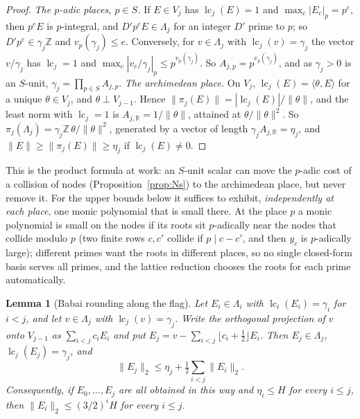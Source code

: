 \documentclass[11pt]{amsart}
\newtheorem{lemma}[theorem]{Lemma}
\theoremstyle{definition}
\theoremstyle{plain}
\newcommand{\Z}{\mathbb{Z}}
\providecommand{\R}{\mathbb{R}}
\begin{document}
\begin{proof}
\emph{The $p$-adic places, $p\in S$.} If $E\in V_j$ has $\operatorname{lc}_j(E)=1$ and $\max_c|E_c|_p=p^e$, then $p^eE$ is $p$-integral, and $D'p^eE\in\Lambda_j$ for an integer $D'$ prime to $p$; so $D'p^e\in\gamma_j\Z$ and $v_p(\gamma_j)\le e$. Conversely, for $v\in\Lambda_j$ with $\operatorname{lc}_j(v)=\gamma_j$ the vector $v/\gamma_j$ has $\operatorname{lc}_j=1$ and $\max_c|v_c/\gamma_j|_p\le p^{v_p(\gamma_j)}$. So $A_{j,p}=p^{v_p(\gamma_j)}$, and as $\gamma_j>0$ is an $S$-unit, $\gamma_j=\prod_{p\in S}A_{j,p}$. \emph{The archimedean place.} On $V_j$, $\operatorname{lc}_j(E)=\langle\theta,E\rangle$ for a unique $\theta\in V_j$, and $\theta\perp V_{j-1}$. Hence $\|\pi_j(E)\|=|\operatorname{lc}_j(E)|/\|\theta\|$, and the least norm with $\operatorname{lc}_j=1$ is $A_{j,\R}=1/\|\theta\|$, attained at $\theta/\|\theta\|^2$. So $\pi_j(\Lambda_j)=\gamma_j\Z\,\theta/\|\theta\|^2$, generated by a vector of length $\gamma_jA_{j,\R}=\eta_j$, and $\|E\|\ge\|\pi_j(E)\|\ge \eta_j$ if $\operatorname{lc}_j(E)\ne0$.
\end{proof}

This is the product formula at work: an $S$-unit scalar can move the $p$-adic cost of a collision of nodes (Proposition~\ref{prop:Ns}) to the archimedean place, but never remove it. For the upper bounds below it suffices to exhibit, \emph{independently at each place}, one monic polynomial that is small there. At the place $p$ a monic polynomial is small on the nodes if its roots sit $p$-adically near the nodes that collide modulo $p$ (two finite rows $c,c'$ collide if $p\mid c-c'$, and then $y_c$ is $p$-adically large); different primes want the roots in different places, so no single closed-form basis serves all primes, and the lattice reduction chooses the roots for each prime automatically.

\begin{lemma}[Babai rounding along the flag]\label{lem:babai}
Let $E_i\in\Lambda_i$ with $\operatorname{lc}_i(E_i)=\gamma_i$ for $i<j$, and let $v\in\Lambda_j$ with $\operatorname{lc}_j(v)=\gamma_j$. Write the orthogonal projection of $v$ onto $V_{j-1}$ as $\sum_{i<j}c_iE_i$ and put $E_j=v-\sum_{i<j}\lfloor c_i+\frac12\rfloor E_i$. Then $E_j\in\Lambda_j$, $\operatorname{lc}_j(E_j)=\gamma_j$, and
\[
\|E_j\|_2\le \eta_j+\tfrac12\textstyle\sum_{i<j}\|E_i\|_2 .
\]
Consequently, if $E_0,\dots,E_j$ are all obtained in this way and $\eta_i\le H$ for every $i\le j$, then $\|E_i\|_2\le(3/2)^iH$ for every $i\le j$.
\end{lemma}
\end{document}
